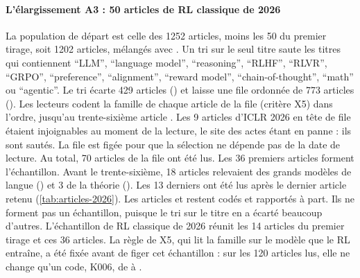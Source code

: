 \paragraph{L'élargissement A3 : 50 articles de RL classique de 2026}
La population de départ est celle des \num{1252} articles, moins les 50 du premier tirage, soit
\num{1202} articles, mélangés avec . Un tri sur le seul titre saute les titres qui contiennent \enquote{LLM}, \enquote{language model},
\enquote{reasoning}, \enquote{RLHF}, \enquote{RLVR}, \enquote{GRPO}, \enquote{preference},
\enquote{alignment}, \enquote{reward model}, \enquote{chain-of-thought}, \enquote{math} ou
\enquote{agentic}. Le tri écarte 429 articles () et
laisse une file ordonnée de 773 articles (). Les lecteurs codent
la famille de chaque article de la file (critère X5) dans l'ordre, jusqu'au trente-sixième article
. Les 9 articles d'ICLR 2026 en tête de file étaient injoignables au moment de la lecture, le
site des actes étant en panne : ils sont sautés. La file est figée pour que la sélection ne dépende pas
de la date de lecture. Au total, 70 articles de la file ont été lus. Les 36 premiers
articles  forment l'échantillon. Avant le trente-sixième, 18 articles relevaient des
grands modèles de langue () et 3 de la théorie (). Les 13 derniers ont été lus
après le dernier article retenu (\cref{tab:articles-2026}). Les articles  et 
restent codés et rapportés à part. Ils ne forment pas un échantillon, puisque le tri sur le titre en a
écarté beaucoup d'autres. L'échantillon de RL classique de 2026 réunit les 14 articles 
du premier tirage et ces 36 articles. La règle de X5, qui lit la famille sur le modèle que le RL
entraîne, a été fixée avant de figer cet échantillon : sur les 120 articles lus, elle ne change qu'un
code, K006, de  à .

